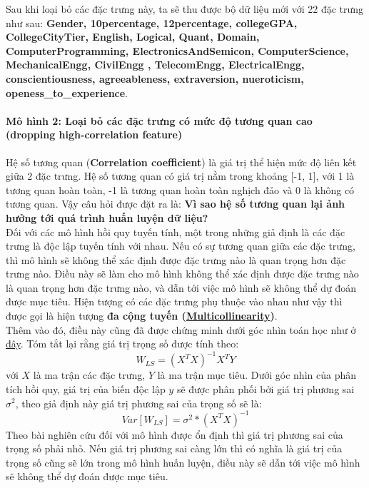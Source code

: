 \documentclass{report}
\begin{document}
    Sau khi loại bỏ các đặc trưng này, ta sẽ thu được bộ dữ liệu mới với 22 đặc trưng như sau:
    \textbf{Gender, 10percentage, 12percentage, collegeGPA, CollegeCityTier, English, Logical, Quant, Domain, ComputerProgramming, ElectronicsAndSemicon, ComputerScience, MechanicalEngg, CivilEngg , TelecomEngg, ElectricalEngg, conscientiousness, agreeableness, extraversion, nueroticism, openess\_to\_experience}.        
    
    \pagebreak
        \paragraph{Mô hình 2: Loại bỏ các đặc trưng có mức độ tương quan cao (dropping high-correlation feature)}\label{sec:dropping-correlation-feature}
    Hệ số tương quan (\textbf{Correlation coefficient}) là giá trị thể hiện mức độ liên kết giữa 2 đặc trưng. Hệ số tương quan có giá trị nằm trong khoảng [-1, 1], với 1 là tương quan hoàn toàn, -1 là tương quan hoàn toàn nghịch đảo và 0 là không có tương quan. Vậy câu hỏi được đặt ra là: \textbf{Vì sao hệ số tương quan lại ảnh hưởng tới quá trình huấn luyện dữ liệu?}\\ 
    
    Đối với các mô hình hồi quy tuyến tính, một trong những giả định là các đặc trưng là độc lập tuyến tính với nhau. Nếu có sự tương quan giữa các đặc trưng, thì mô hình sẽ không thể xác định được đặc trưng nào là quan trọng hơn đặc trưng nào. Điều này sẽ làm cho mô hình không thể xác định được đặc trưng nào là quan trọng hơn đặc trưng nào, và dẫn tới việc mô hình sẽ không thể dự đoán được mục tiêu. Hiện tượng có các đặc trưng phụ thuộc vào nhau như vậy thì được gọi là hiện tượng \textbf{đa cộng tuyến (\href{https://en.wikipedia.org/wiki/Multicollinearity}{Multicollinearity})}.\\

    Thêm vào đó, điều này cũng đã được chứng minh dưới góc nhìn toán học như ở \href{https://www.quora.com/Why-is-it-important-to-remove-correlated-variables-when-performing-machine-learning-If-2-variables-are-correlated-how-do-you-choose-which-one-to-exclude-from-the-data-set}{đây}. Tóm tắt lại rằng giá trị trọng số được tính theo:
        \begin{equation}
            W_{LS} = (X^T  X)^{-1}  X^T  Y
        \end{equation}
    với $X$ là ma trận các đặc trưng, $Y$ là ma trận mục tiêu. Dưới góc nhìn của phân tích hồi quy, giá trị của biến độc lập $y$ sẽ được phân phối bởi giá trị phương sai \textbf{$\sigma^2$}, theo giả định này giá trị phương sai của trọng số sẽ là:
        \begin{equation}
            Var[W_{LS}] = \sigma^2 * (X^T X)^{-1} 
        \end{equation}
    Theo bài nghiên cứu đối với mô hình được ổn định thì giá trị phương sai của trọng số phải nhỏ. Nếu giá trị phương sai càng lớn thì có nghĩa là giá trị của trọng số cũng sẽ lớn trong mô hình huấn luyện, điều này sẽ dẫn tới việc mô hình sẽ không thể dự đoán được mục tiêu.
\end{document}
